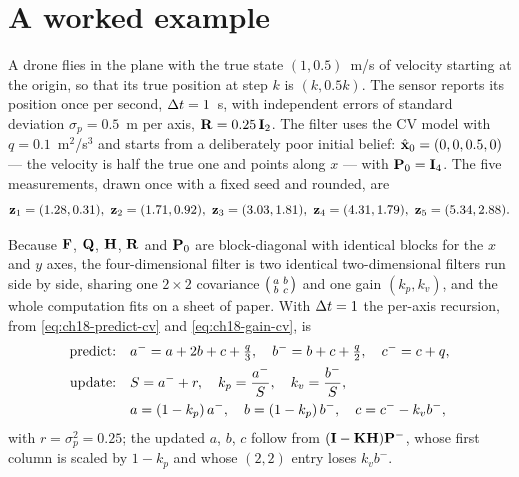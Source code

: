 \section{A worked example}
\label{sec:ch18-example}

\begin{example}
\label{ex:ch18-five}
A drone flies in the plane with the true state $(1,0.5)$~m/s of velocity
starting at the origin, so that its true position at step $k$ is $(k,0.5k)$.
The sensor reports its position once per second, $\Delta t=1$~s, with independent
errors of standard deviation $\sigma_p=0.5$~m per axis, $\mathbf{R}=0.25\,\mathbf{I}_2$.
The filter uses the CV model with $q=0.1$~m$^2$/s$^3$ and starts from a
deliberately poor initial belief: $\hat{\mathbf{x}}_0=(0,0,0.5,0)$ --- the
velocity is half the true one and points along $x$ --- with
$\mathbf{P}_0=\mathbf{I}_4$. The five measurements, drawn once with a fixed seed and
rounded, are
\[
  \meas_1=(1.28,0.31),\ \meas_2=(1.71,0.92),\ \meas_3=(3.03,1.81),\
  \meas_4=(4.31,1.79),\ \meas_5=(5.34,2.88).
\]
\end{example}

Because $\mathbf{F}$, $\mathbf{Q}$, $\mathbf{H}$, $\mathbf{R}$ and $\mathbf{P}_0$ are
block-diagonal with identical blocks for the $x$ and $y$ axes, the
four-dimensional filter is two identical two-dimensional filters run side by
side, sharing one $2\times2$ covariance
$\begin{psmallmatrix}a&b\\ b&c\end{psmallmatrix}$ and one gain $(k_p,k_v)$,
and the whole computation fits on a sheet of paper. With $\Delta t=1$ the
per-axis recursion, from \cref{eq:ch18-predict-cv} and
\cref{eq:ch18-gain-cv}, is
\begin{align}
  \text{predict:}&\quad a^-=a+2b+c+\tfrac{q}{3},\quad b^-=b+c+\tfrac{q}{2},\quad c^-=c+q,\notag\\
  \text{update:}&\quad S=a^-+r,\quad k_p=\frac{a^-}{S},\quad k_v=\frac{b^-}{S},\notag\\
  &\quad a=(1-k_p)\,a^-,\quad b=(1-k_p)\,b^-,\quad c=c^--k_v b^- ,
  \label{eq:ch18-example-recursion}
\end{align}
with $r=\sigma_p^2=0.25$; the updated $a$, $b$, $c$ follow from
$(\mathbf{I}-\mathbf{K}\mathbf{H})\mathbf{P}^-$, whose first column is scaled by $1-k_p$
and whose $(2,2)$ entry loses $k_v b^-$.

